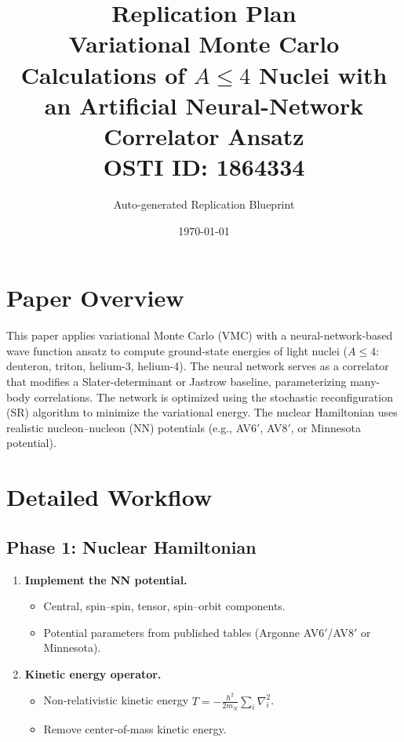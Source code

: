 \documentclass[11pt,a4paper]{article}
\title{\textbf{Replication Plan}\\[0.5em]
\large Variational Monte Carlo Calculations of $A \leq 4$ Nuclei with an Artificial Neural-Network Correlator Ansatz\\[0.3em]
\normalsize OSTI ID: 1864334}
\author{Auto-generated Replication Blueprint}
\date{\today}
\begin{document}
\maketitle
\tableofcontents
\newpage

\section{Paper Overview}
This paper applies variational Monte Carlo (VMC) with a neural-network-based wave function ansatz to compute ground-state energies of light nuclei ($A \leq 4$: deuteron, triton, helium-3, helium-4). The neural network serves as a correlator that modifies a Slater-determinant or Jastrow baseline, parameterizing many-body correlations. The network is optimized using the stochastic reconfiguration (SR) algorithm to minimize the variational energy. The nuclear Hamiltonian uses realistic nucleon--nucleon (NN) potentials (e.g., AV6$'$, AV8$'$, or Minnesota potential).

\section{Detailed Workflow}

\subsection{Phase 1: Nuclear Hamiltonian}
\begin{enumerate}[label=\textbf{1.\arabic*}]
  \item \textbf{Implement the NN potential.}
    \begin{itemize}
      \item Central, spin--spin, tensor, spin--orbit components.
      \item Potential parameters from published tables (Argonne AV6$'$/AV8$'$ or Minnesota).
    \end{itemize}
  \item \textbf{Kinetic energy operator.}
    \begin{itemize}
      \item Non-relativistic kinetic energy $T = -\frac{\hbar^2}{2m_N} \sum_i \nabla_i^2$.
      \item Remove center-of-mass kinetic energy.
    \end{itemize}
\end{enumerate}
\end{document}
